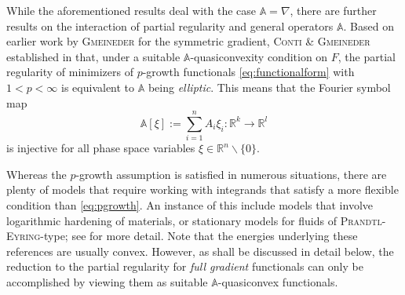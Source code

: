 \documentclass[a4paper,11pt]{amsart}
\numberwithin{equation}{section}
\newcommand{\R}{\mathbb{R}}
\begin{document}
	While the aforementioned  results deal with the case $\mathbb{A}=\nabla$, there are further results on the interaction of partial regularity and general operators $\mathbb{A}$. Based on earlier work by \textsc{Gmeineder} \cite{gmeineder_partial_2021} for the symmetric gradient, \textsc{Conti \& Gmeineder} established in \cite{contiFXG} that, under a suitable $\mathbb{A}$-quasiconvexity condition on  $F$, the partial regularity of minimizers of $p$-growth functionals \eqref{eq:functionalform} with $1<p<\infty$ is equivalent to $\mathbb{A}$ being \emph{elliptic}. This means that the Fourier symbol map $$\mathbb{A}[\xi] := \sum_{i=1}^n A_i \xi_i \colon \R^k \to \R^l$$ is injective for all phase space variables $\xi \in \R^n \backslash \{0\}$. 
	
	Whereas the $p$-growth assumption is satisfied in numerous situations, there are plenty of models that require working with integrands that satisfy a more flexible condition than \eqref{eq:pgrowth}. An instance of this include models that involve logarithmic hardening of materials, or stationary models for fluids of \textsc{Prandtl-Eyring}-type; see \cite{BREIT20121910,FrehseSeregin,Fuchs1999VariationalMF,fuchs_variational_2000} for more detail.  {Note that the energies underlying these references are usually convex. However, as shall be discussed in detail below, the reduction to the partial regularity for \emph{full gradient} functionals can only be accomplished by viewing them as suitable $\mathbb{A}$-quasiconvex functionals.}
	
\end{document}
